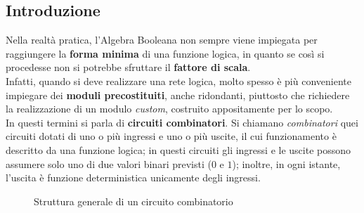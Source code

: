 \documentclass[a4paper]{extarticle}
\begin{document}
\subsection{Introduzione}
Nella realtà pratica, l'Algebra Booleana non sempre viene impiegata per raggiungere la \textbf{forma minima} di una funzione logica, in quanto se così si procedesse non si potrebbe sfruttare il \textbf{fattore di scala}.\\
Infatti, quando si deve realizzare una rete logica, molto spesso è più conveniente impiegare dei \textbf{moduli precostituiti}, anche ridondanti, piuttosto che richiedere la realizzazione di un modulo \textit{custom}, costruito appositamente per lo scopo.\\
In questi termini si parla di \textbf{circuiti combinatori}. Si chiamano \emph{combinatori} quei circuiti dotati di uno o più ingressi e uno o più uscite, il cui funzionamento è descritto da una funzione logica; in questi circuiti gli ingressi e le uscite possono assumere solo uno di due valori binari previsti ($0$ e $1$); inoltre, in ogni istante, l’uscita è funzione deterministica unicamente degli ingressi.

\begin{figure}[H]
    \centering
    \caption{Struttura generale di un circuito combinatorio}
    \label{fig:struttura_generale_circuito_combinatorio}
\end{figure}
\end{document}
